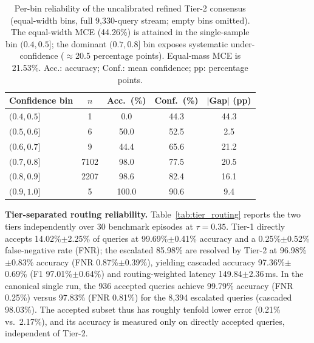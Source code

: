 \documentclass[preprint,12pt]{elsarticle}
\begin{document}
\begin{table}[htbp]
\centering
\caption{Per-bin reliability of the uncalibrated refined Tier-2 consensus (equal-width bins, full 9,330-query stream; empty bins omitted). The equal-width MCE (44.26\%) is attained in the single-sample bin $(0.4,0.5]$; the dominant $(0.7,0.8]$ bin exposes systematic under-confidence ($\approx$20.5 percentage points). Equal-mass MCE is 21.53\%. Acc.: accuracy; Conf.: mean confidence; pp: percentage points.}
\label{tab:reliability_bins}
\small
\begin{tabular}{lcccc}
\toprule
\textbf{Confidence bin} & \textbf{$n$} & \textbf{Acc.\ (\%)} & \textbf{Conf.\ (\%)} & \textbf{$|$Gap$|$ (pp)} \\
\midrule
$(0.4,0.5]$ & 1    & 0.0   & 44.3 & 44.3 \\
$(0.5,0.6]$ & 6    & 50.0  & 52.5 & 2.5 \\
$(0.6,0.7]$ & 9    & 44.4  & 65.6 & 21.2 \\
$(0.7,0.8]$ & 7102 & 98.0  & 77.5 & 20.5 \\
$(0.8,0.9]$ & 2207 & 98.6  & 82.4 & 16.1 \\
$(0.9,1.0]$ & 5    & 100.0 & 90.6 & 9.4 \\
\bottomrule
\end{tabular}
\end{table}

\textbf{Tier-separated routing reliability.} Table~\ref{tab:tier_routing} reports the two tiers independently over 30 benchmark episodes at $\tau=0.35$. Tier-1 directly accepts 14.02\%$\pm$2.25\% of queries at 99.69\%$\pm$0.41\% accuracy and a 0.25\%$\pm$0.52\% false-negative rate (FNR); the escalated 85.98\% are resolved by Tier-2 at 96.98\%$\pm$0.83\% accuracy (FNR 0.87\%$\pm$0.39\%), yielding cascaded accuracy 97.36\%$\pm$0.69\% (F1 97.01\%$\pm$0.64\%) and routing-weighted latency 149.84$\pm$2.36\,ms. In the canonical single run, the 936 accepted queries achieve 99.79\% accuracy (FNR 0.25\%) versus 97.83\% (FNR 0.81\%) for the 8,394 escalated queries (cascaded 98.03\%). The accepted subset thus has roughly tenfold lower error (0.21\% vs.\ 2.17\%), and its accuracy is measured only on directly accepted queries, independent of Tier-2.
\end{document}
